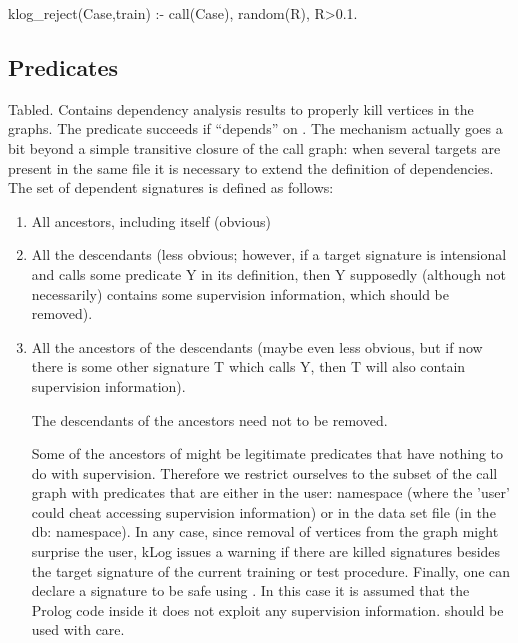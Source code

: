 \begin{code}
klog_reject(Case,train) :-
  \+ call(Case),
  random(R),
  R>0.1.
\end{code}

\subsection{Predicates}

\vspace{0.7cm}

\begin{description}
Tabled. Contains dependency analysis results to properly kill vertices in
the graphs. The predicate succeeds if  ``depends'' on . The
mechanism actually goes a bit beyond a simple transitive closure of
the call graph: when several targets are present in the same file it
is necessary to extend the definition of dependencies. The set of
dependent signatures is defined as follows:

\begin{enumerate}
    \item All ancestors, including  itself (obvious)
    \item All the descendants (less obvious; however, if a target signature
 is intensional and calls some predicate Y in its definition, then
Y supposedly (although not necessarily) contains some supervision
information, which should be removed).
    \item All the ancestors of the descendants (maybe even less obvious,
but if now there is some other signature T which calls Y, then T
will also contain supervision information).

The descendants of the ancestors need not to be removed.

Some of the ancestors of  might be legitimate predicates that have
nothing to do with supervision. Therefore we restrict ourselves to
the subset of the call graph with predicates that are either in the
user: namespace (where the 'user' could cheat accessing supervision
information) or in the data set file (in the db: namespace). In any
case, since removal of vertices from the graph might surprise the
user, kLog issues a warning if there are killed signatures besides
the target signature of the current training or test
procedure. Finally, one can declare a signature to be safe using
. In this case it is assumed that the Prolog code inside it
does not exploit any supervision information.  should be used
with care.


\end{enumerate}
\end{description}
